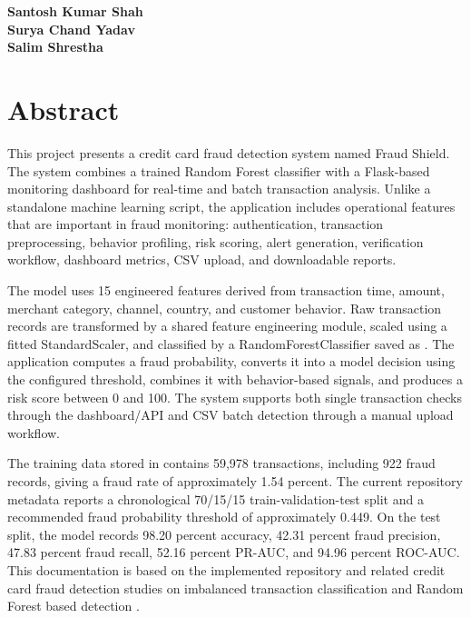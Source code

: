 \documentclass[12pt,a4paper]{report}
\begin{document}
\vspace{1cm}
\begin{flushright}
\textbf{Santosh Kumar Shah}\\
\textbf{Surya Chand Yadav}\\
\textbf{Salim Shrestha}
\end{flushright}

\newpage

\chapter*{Abstract}

This project presents a credit card fraud detection system named Fraud Shield. The system combines a trained Random Forest classifier with a Flask-based monitoring dashboard for real-time and batch transaction analysis. Unlike a standalone machine learning script, the application includes operational features that are important in fraud monitoring: authentication, transaction preprocessing, behavior profiling, risk scoring, alert generation, verification workflow, dashboard metrics, CSV upload, and downloadable reports.

The model uses 15 engineered features derived from transaction time, amount, merchant category, channel, country, and customer behavior. Raw transaction records are transformed by a shared feature engineering module, scaled using a fitted StandardScaler, and classified by a RandomForestClassifier saved as . The application computes a fraud probability, converts it into a model decision using the configured threshold, combines it with behavior-based signals, and produces a risk score between 0 and 100. The system supports both single transaction checks through the dashboard/API and CSV batch detection through a manual upload workflow.

The training data stored in  contains 59,978 transactions, including 922 fraud records, giving a fraud rate of approximately 1.54 percent. The current repository metadata reports a chronological 70/15/15 train-validation-test split and a recommended fraud probability threshold of approximately 0.449. On the test split, the model records 98.20 percent accuracy, 42.31 percent fraud precision, 47.83 percent fraud recall, 52.16 percent PR-AUC, and 94.96 percent ROC-AUC. This documentation is based on the implemented repository and related credit card fraud detection studies on imbalanced transaction classification and Random Forest based detection \cite{mallidi2021analysis,adesina2024creditcard,tadvi2021realtime}.
\end{document}
